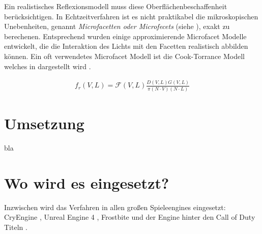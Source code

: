 
Ein realistisches Reflexionsmodell muss diese Oberflächenbeschaffenheit berücksichtigen. In Echtzeitverfahren ist es nicht praktikabel die mikroskopischen Unebenheiten, genannt \textit{Microfacetten oder Microfecets} (siehe ), exakt zu berechenen. Entsprechend wurden einige approximierende Microfacet Modelle entwickelt, die die Interaktion des Lichts mit den Facetten realistisch abbilden können. Ein oft verwendetes Microfacet Modell ist die Cook-Torrance Modell \parencite{Cook1981} welches in  dargestellt wird \parencite[Kapitel 6.9.2, Seite 194]{Lengyel2003}.

\begin{align}
	\label{eq:cook-torrance-model}
	f_r(V,L) = \mathcal{F}(V,L)\frac{D(V,L)G(V,L)}{\pi(N \cdot V)(N \cdot L)}
\end{align}

\section{Umsetzung}
\label{sec:pbr-umsetzung}

bla

\section{Wo wird es eingesetzt?}
\label{sec:pbr-wo}
Inzwischen wird das Verfahren in allen großen Spieleengines eingesetzt: CryEngine \parencite{Schulz2014}, Unreal Engine 4 \parencite{Martin2012}, Frostbite \parencite{Lagarde2014} und der Engine hinter den Call of Duty Titeln \parencite{Lazarov2011}.
